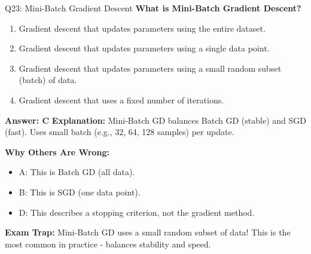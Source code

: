 \documentclass[8pt]{beamer}
\begin{document}
	\begin{frame}{Q23: Mini-Batch Gradient Descent}
		\fontsize{6.5}{7.5}\selectfont
		\textbf{What is Mini-Batch Gradient Descent?}
		
		\begin{enumerate}
			\item Gradient descent that updates parameters using the entire dataset.
			\item Gradient descent that updates parameters using a single data point.
			\item Gradient descent that updates parameters using a small random subset (batch) of data.
			\item Gradient descent that uses a fixed number of iterations.
		\end{enumerate}
		
		\vspace{0.05cm}
		\textcolor{myblue}{\textbf{Answer: C}}
		\vspace{0.05cm}
		\textcolor{myblue}{\textbf{Explanation:}} Mini-Batch GD balances Batch GD (stable) and SGD (fast). Uses small batch (e.g., 32, 64, 128 samples) per update.
		
		\vspace{0.05cm}
		\textcolor{myred}{\textbf{Why Others Are Wrong:}}
		\begin{itemize}
			\item \textcolor{myred}{A:} This is Batch GD (all data).
			\item \textcolor{myred}{B:} This is SGD (one data point).
			\item \textcolor{myred}{D:} This describes a stopping criterion, not the gradient method.
		\end{itemize}
		
		\textcolor{myred}{\textbf{Exam Trap:}} Mini-Batch GD uses a \textcolor{myblue}{small random subset} of data! This is the most common in practice - balances stability and speed.
	\end{frame}
	
\end{document}
